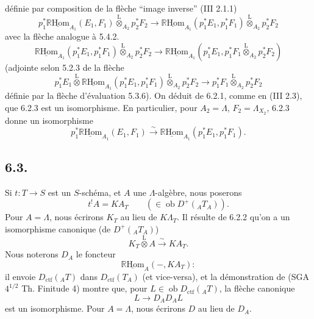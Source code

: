 \documentclass[11pt]{article}
\newcommand{\R}{\mathbb{R}}\newcommand{\RHomCore}{\mathbb{R}\mathrm{Hom}}
\providecommand{\RHom}{\RHomCore}
\providecommand{\uRHom}{\underline{\RHom}}
\providecommand{\lten}{\overset{\mathrm L}{\otimes}}
\providecommand{\Ob}{\operatorname{ob}}
\providecommand{\RHom}{\RHomCore}
\providecommand{\lten}{\overset{\mathrm L}{\otimes}}
\providecommand{\RHom}{\R\mathcal{H}om}
\providecommand{\lten}{\overset{\mathrm L}{\otimes}}
\providecommand{\Ob}{\operatorname{ob}}
\providecommand{\R}{\mathrm R}
\providecommand{\lten}{\overset{\mathrm L}{\otimes}}
\providecommand{\lten}{\overset{\mathrm L}{\otimes}}
\providecommand{\Ob}{\operatorname{Ob}}
\providecommand{\lten}{\overset{\mathrm L}{\otimes}}
\providecommand{\RHom}{\RHomCore}
\providecommand{\Ob}{\operatorname{ob}}
\providecommand{\Ob}{\operatorname{Ob}}
\providecommand{\lten}{\overset{\mathrm L}{\otimes}}
\begin{document}
définie par composition de la flèche ``image inverse'' (III 2.1.1)
\[
p_1^*\uRHom_{A_1}(E_1,F_1)\lten_{A_2}p_2^*F_2
\longrightarrow
\uRHom_{A_1}(p_1^*E_1,p_1^*F_1)\lten_{A_2}p_2^*F_2
\]
avec la flèche analogue à 5.4.2.
\[
\uRHom_{A_1}(p_1^*E_1,p_1^*F_1)\lten_{A_2}p_2^*F_2
\longrightarrow
\uRHom_{A_1}(p_1^*E_1,p_1^*F_1\lten_{A_2}p_2^*F_2)
\]
(adjointe selon 5.2.3 de la flèche
\[
p_1^*E_1\lten\uRHom_{A_1}(p_1^*E_1,p_1^*F_1)\lten_{A_2}p_2^*F_2
\longrightarrow
p_1^*F_1\lten_{A_2}p_2^*F_2
\]
définie par la flèche d'évaluation 5.3.6). On déduit de 6.2.1, comme en (III 2.3), 
que 6.2.3 est un
isomorphisme. En particulier, pour $A_2=\Lambda$, $F_2=\Lambda_{X_2}$, 6.2.3 donne un isomorphisme
\begin{equation}
p_1^*\uRHom_{A_1}(E_1,F_1)
\xrightarrow{\sim}
\uRHom_{A_1}(p_1^*E_1,p_1^*F_1).
\tag{6.2.4}
\end{equation}

\subsection*{6.3.}
Si $t:T\to S$ est un $S$-schéma, et $A$ une $\Lambda$-algèbre, nous poserons
\begin{equation}
t^!A = KA_T \qquad(\in\Ob D^+({}_AT_A)).
\tag{6.3.1}
\end{equation}
Pour $A=\Lambda$, nous écrirons $K_T$ au lieu de $K\Lambda_T$. Il résulte de 6.2.2 qu'on a un isomorphisme canonique (de $D^+({}_AT_A)$)
\begin{equation}
K_T\lten A\xrightarrow{\sim}KA_T.
\tag{6.3.2}
\end{equation}
Nous noterons $D_A$ le foncteur
\[
\uRHom_A(-,KA_T) :
\]
il envoie $D_{\mathrm{ctf}}({}_AT)$ dans $D_{\mathrm{ctf}}(T_A)$ (et vice-versa), et la démonstration de (SGA $4^{1/2}$ Th. Finitude 4) montre que, pour $L\in\Ob D_{\mathrm{ctf}}({}_AT)$, la flèche canonique
\[
L\longrightarrow D_AD_AL
\]
est un isomorphisme. Pour $A=\Lambda$, nous écrirons $D$ au lieu de $D_A$.
\end{document}
